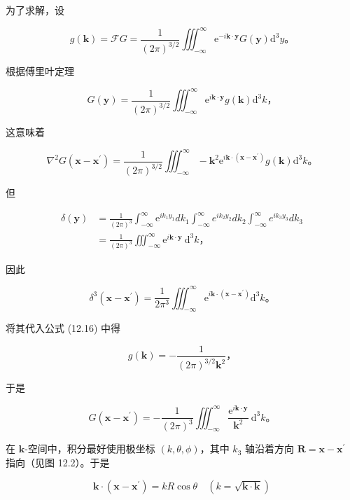 为了求解，设

$$
g(\mathbf{k})=\mathcal{F} G=\frac{1}{(2 \pi)^{3 / 2}} \iiint_{-\infty}^{\infty} \mathrm{e}^{-i \mathbf{k} \cdot \mathbf{y}} G(\mathbf{y}) \mathrm{d}^{3} y。
$$

根据傅里叶定理

$$
G(\mathbf{y})=\frac{1}{(2 \pi)^{3 / 2}} \iiint_{-\infty}^{\infty} \mathrm{e}^{i \mathbf{k} \cdot \mathbf{y}} g(\mathbf{k}) \mathrm{d}^{3} k，
$$

这意味着

$$
\nabla^{2} G\left(\mathbf{x}-\mathbf{x}^{\prime}\right)=\frac{1}{(2 \pi)^{3 / 2}} \iiint_{-\infty}^{\infty}-\mathbf{k}^{2} \mathrm{e}^{i \mathbf{k} \cdot \left(\mathbf{x}-\mathbf{x}^{\prime}\right)} g(\mathbf{k}) \mathrm{d}^{3} k。
$$

但

$$
\begin{aligned}
\delta(\mathbf{y}) & =\frac{1}{(2 \pi)^{3}} \int_{-\infty}^{\infty} \mathrm{e}^{i k_{1} y_{1}} d k_{1} \int_{-\infty}^{\infty} e^{i k_{2} y_{2}} d k_{2} \int_{-\infty}^{\infty} e^{i k_{3} y_{3}} d k_{3} \\
& =\frac{1}{(2 \pi)^{3}} \iiint_{-\infty}^{\infty} \mathrm{e}^{i \mathbf{k} \cdot \mathbf{y}} \mathrm{~d}^{3} k，
\end{aligned}
$$

因此

$$
\delta^{3}\left(\mathbf{x}-\mathbf{x}^{\prime}\right)=\frac{1}{2 \pi^{3}} \iiint_{-\infty}^{\infty} \mathrm{e}^{i \mathbf{k} \cdot\left(\mathbf{x}-\mathbf{x}^{\prime}\right)} \mathrm{d}^{3} k。
$$

将其代入公式 (12.16) 中得

$$
g(\mathbf{k})=-\frac{1}{(2 \pi)^{3 / 2} \mathbf{k}^{2}}，
$$

于是

\begin{equation}\label{eq:12.17} 
 G\left(\mathbf{x}-\mathbf{x}^{\prime}\right)=-\frac{1}{(2 \pi)^{3}} \iiint_{-\infty}^{\infty} \frac{\mathrm{e}^{i \mathbf{k} \cdot \mathbf{y}}}{\mathbf{k}^{2}} \mathrm{~d}^{3} k。 
 \end{equation}

在 $\mathbf{k}$-空间中，积分最好使用极坐标 $(k, \theta, \phi)$，其中
$k_{3}$ 轴沿着方向 $\mathbf{R}=\mathbf{x}-\mathbf{x}^{\prime}$
指向（见图 12.2）。于是

$$
\mathbf{k} \cdot\left(\mathbf{x}-\mathbf{x}^{\prime}\right)=k R \cos \theta \quad(k=\sqrt{\mathbf{k} \cdot \mathbf{k}})
$$

